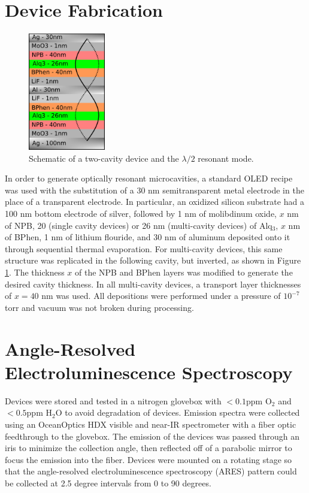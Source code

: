 \documentclass{report}
\begin{document}
    \section{Device Fabrication} \label{fab}
    \begin{figure}
        \centering
        \vspace{-0.5cm}
        \includegraphics[width=0.3\textwidth]{images/schematic.png}
        \caption{\small Schematic of a two-cavity device and the $\lambda/2$ resonant mode.}
        \label{fig:schematic}
        \vspace{-0.5cm}
    \end{figure}
    In order to generate optically resonant microcavities, a standard OLED recipe\cite{Cai2011,Matsushima2008} was used with the substitution of a 30 nm semitransparent metal electrode in the place of a transparent electrode. In particular, an oxidized silicon substrate had a 100 nm bottom electrode of silver, followed by 1 nm of molibdinum oxide, $x$ nm of NPB, 20 (single cavity devices) or 26 nm (multi-cavity devices) of Alq$_3$, $x$ nm of BPhen, 1 nm of lithium flouride, and 30 nm of aluminum deposited onto it through sequential thermal evaporation. For multi-cavity devices, this same structure was replicated in the following cavity, but inverted, as shown in Figure \ref{fig:schematic}. The thickness $x$ of the NPB and BPhen layers was modified to generate the desired cavity thickness. In all multi-cavity devices, a transport layer thicknesses of $x=40$ nm was used. All depositions were performed under a pressure of $10^{-7}$torr and vacuum was not broken during processing.

    \section{Angle-Resolved Electroluminescence Spectroscopy} \label{spect}
    Devices were stored and tested in a nitrogen glovebox with $<0.1$ppm O$_2$ and $<0.5$ppm H$_2$O to avoid degradation of devices. Emission spectra were collected using an OceanOptics HDX visible and near-IR spectrometer with a fiber optic feedthrough to the glovebox. The emission of the devices was passed through an iris to minimize the collection angle, then reflected off of a parabolic mirror to focus the emission into the fiber. Devices were mounted on a rotating stage so that the angle-resolved electroluminescence spectroscopy (ARES) pattern could be collected at 2.5 degree intervals from 0 to 90 degrees.
\end{document}
